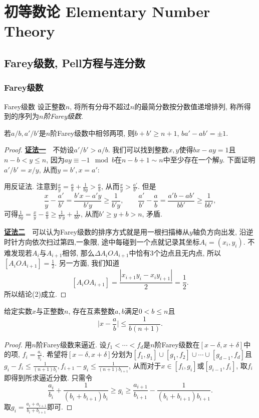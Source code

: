 \chapter{初等数论 Elementary Number Theory}

\section{Farey级数, Pell方程与连分数}

\subsection{Farey级数}

\begin{definition}{Farey级数}
	设正整数$n$, 将所有分母不超过$n$的最简分数按分数值递增排列, 称所得到的序列为\textit{$n$阶Farey级数}. 
\end{definition}

\begin{proposition}{}
	若$a/b, a'/b'$是$n$阶Farey级数中相邻两项, 则$b+b' \geq n+1$, $ba'-ab'=\pm 1$. 
\end{proposition}
\begin{proof}
	\underline{\textbf{证法一}}~~不妨设$a'/b' > a/b$. 我们可以找到整数$x,y$使得$bx-ay=1$且$n-b < y \leq n$, 因为$ay \equiv -1 \mod b$在$n-b+1 \sim n$中至少存在一个解$y$. 下面证明$a'/b'=x/y$, 从而$y=b',x=a'$: 
	
	用反证法. 注意到$\frac{x}{y} = \frac{a}{b} + \frac{1}{by} > \frac{a}{b}$, 从而$\frac{x}{y} > \frac{a'}{b'}$. 但是$$\frac{x}{y} - \frac{a'}{b'} = \frac{b'x-a'y}{b'y} \geq \frac{1}{b'y},\qquad \frac{a'}{b'} - \frac{a}{b} = \frac{a'b-ab'}{bb'} \geq \frac{1}{bb'}, $$
	可得$\frac{1}{by} = \frac{x}{y} - \frac{a}{b} \geq \frac{1}{b'y}+\frac{1}{bb'}$, 从而$b' \geq y+b >n$, 矛盾. 
	
	\underline{\textbf{证法二}}~~可以认为Farey级数的排序方式就是用一根扫描棒从$y$轴负方向出发, 沿逆时针方向依次扫过第四,一象限, 途中每碰到一个点就记录其坐标$A_i=(x_i,y_i)$. 不难发现若$A_i$与$A_{i+1}$相邻, 那么$\Delta A_iOA_{i+1}$中恰有$3$个边点且无内点, 所以$[A_iOA_{i+1}] = \frac{1}{2}$. 另一方面, 我们知道$$[A_iOA_{i+1}] = \frac{|x_{i+1}y_i-x_iy_{i+1}|}{2} = \frac{1}{2}.$$
	所以结论(2)成立. 
\end{proof}

\begin{corollary}{}
	给定实数$x$与正整数$n$, 存在互素整数$a,b$满足$0<b \leq n$且$$\big| x-\frac{a}{b} \big| \leq \frac{1}{b(n+1)}.$$
\end{corollary}
\begin{proof}
	用$n$阶Farey级数来逼近. 设$f_1<\cdots < f_d$是$n$阶Farey级数在$[x-\delta ,x+\delta]$中的项, $f_i=\frac{a_i}{b_i}$. 希望将$[x-\delta ,x+\delta]$分划为$[f_1,g_1]\cup [g_1,f_2] \cup \cdots \cup [g_{d-1},f_d]$且$g_i-f_i \leq \frac{1}{(n+1)b_i}, f_{i+1}-g_i \leq \frac{1}{(n+1)b_{i+1}}$, 从而对于$x \in [f_i,g_i]$或$[g_{i-1},f_i]$, 取$f_i$即得到所求逼近分数. 只需令$$\frac{a_i}{b_i} + \frac{1}{(b_i+b_{i+1})b_i}\geq g_i \geq \frac{a_{i+1}}{b_{i+1}} - \frac{1}{(b_i+b_{i+1})b_{i+1}}. $$
	取$g_i=\frac{a_i+a_{i+1}}{b_i+b_{i+1}}$即可. 
\end{proof}

